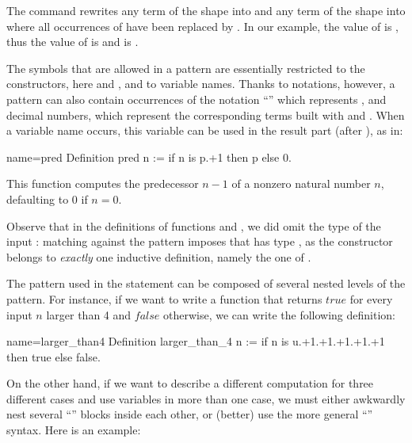 The  command rewrites any term of the shape
 into  and any term of the shape
 into  where all occurrences of
 have been replaced by .  In our example, the value of
 is , thus the value of  is  and  is .


The symbols that are allowed in a pattern are essentially restricted
to the constructors, here  and , and to variable names.
Thanks to notations, however, a pattern can also contain
occurrences of the notation ``'' which represents , and
decimal numbers, which represent the corresponding terms built with
 and .  When a variable name occurs, this variable can be
used in the result part (after ), as in:

\begin{coq}{name=pred}{}
Definition pred n := if n is p.+1 then p else 0.
\end{coq}

This function  computes the predecessor \(n-1\) of a
nonzero natural number \(n\), defaulting to \(0\) if \(n = 0\).

Observe that in the definitions of functions  and
, we did omit the type of the input : matching
 against  the  pattern imposes that  has type
, as the  constructor belongs to \emph{exactly}
one inductive definition, namely the one of .

The pattern used in the  statement can be composed of
several nested levels of the  pattern.  For instance,
if we want to write a function
that returns \(true\) for every input \(n\) larger than 4
and \(false\) otherwise, we can write the following definition:

\begin{coq}{name=larger_than4}{}
Definition larger_than_4 n :=
  if n is u.+1.+1.+1.+1.+1 then true else false.
\end{coq}

On the other hand, if we want to describe a different computation for
three different cases and use variables in more than one case, we
must either awkwardly nest several ``'' blocks
inside each other, or (better) use the more general
``'' syntax.  Here is an example:

